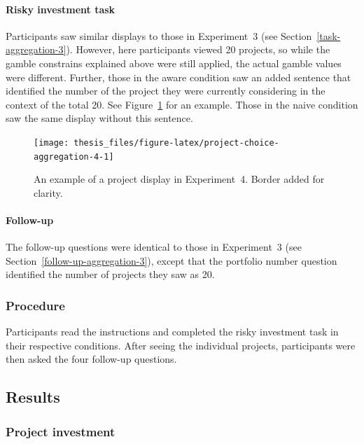 \documentclass[a4paper, nobind, dvipsnames]{templates/ociamthesis}
\theoremstyle{definition}
\theoremstyle{definition}
\theoremstyle{definition}
\theoremstyle{definition}
\theoremstyle{remark}
\begin{document}
\paragraph{Risky investment task}

Participants saw similar displays to those in Experiment~3 (see
Section~\ref{task-aggregation-3}). However, here participants viewed 20
projects, so while the gamble constrains explained above were still applied, the
actual gamble values were different. Further, those in the aware condition saw
an added sentence that identified the number of the project they were currently
considering in the context of the total 20. See
Figure~\ref{fig:project-choice-aggregation-4} for an example. Those in the
naive condition saw the same display without this sentence.



\begin{figure}
\texttt{[image: thesis\_files/figure-latex/project-choice-aggregation-4-1]} \caption{An example of a project display in Experiment~4. Border added for clarity.}\label{fig:project-choice-aggregation-4}
\end{figure}

\paragraph{Follow-up}

The follow-up questions were identical to those in Experiment~3 (see
Section~\ref{follow-up-aggregation-3}), except that the portfolio number
question identified the number of projects they saw as 20.

\subsubsection{Procedure}

Participants read the instructions and completed the risky investment task in
their respective conditions. After seeing the individual projects, participants
were then asked the four follow-up questions.

\subsection{Results}

\subsubsection{Project investment}
\end{document}
